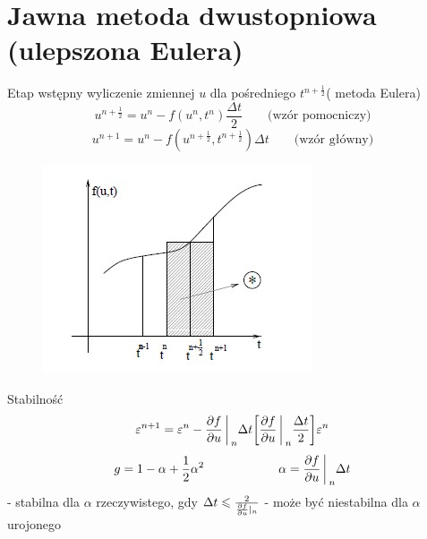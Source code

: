 \section{Jawna metoda dwustopniowa (ulepszona Eulera)}
\begin{frame}{Etap wstępny}
	wyliczenie zmiennej $u$ dla pośredniego $t^{n+\frac{1}{2}}$( metoda Eulera)
    $$u^{n+\frac{1}{2}} = u^n - f(u^n,t^n)\frac{\Delta t}{2} \qquad \text{(wzór pomocniczy)}$$
    $$u^{n+1} = u^n - f(u^{n+\frac{1}{2}},t^{n+\frac{1}{2}})\Delta t \qquad \text{(wzór główny)}$$
\end{frame}
\begin{frame}
	 \begin{figure}
	\includegraphics[height=0.6\textheight]{img/metoda_skokowa.jpg}
	\end{figure}
\end{frame}
\begin{frame}{Stabilność}
	$$\varepsilon^{n+1} = \varepsilon^n - \frac{\partial f}{\partial u}\bigg\arrowvert_n\Delta t\bigg[\frac{\partial f}{\partial u} \bigg\arrowvert_n\frac{\Delta t}{2}\bigg]\varepsilon^n$$
    $$g = 1-\alpha +\frac{1}{2}\alpha^2 \qquad \qquad \qquad \alpha = \frac{\partial f}{\partial u}\bigg\arrowvert_n \Delta t$$
    \newline
    - stabilna dla $\alpha$ rzeczywistego, gdy $\Delta t \leqslant \frac{2}{\frac{\partial f}{\partial u}\arrowvert_n}$
    \newline
    - może być niestabilna dla $\alpha$ urojonego
\end{frame}
